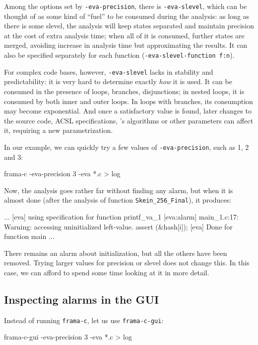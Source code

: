 \documentclass{frama-c-book}
\begin{document}
Among the options set by \verb|-eva-precision|, there is \verb|-eva-slevel|,
which can be thought of as some kind of ``fuel''
to be consumed during the analysis: as long as there is some slevel,
the analysis will keep states separated and maintain precision at the cost of
extra analysis time; when all of
it is consumed, further states are merged, avoiding increase in analysis time
but approximating the results. It can also be
specified separately for each function (\verb|-eva-slevel-function f:n|).

For complex code bases, however, \verb|-eva-slevel| lacks in stability and
predictability: it is very hard to determine exactly {\em how} it is used.
It can be consumed in the presence of loops, branches, disjunctions;
in nested loops, it is consumed by both inner and outer loops.
In loops with branches, its consumption may become exponential.
And once a satisfactory value is found, later changes to the source code,
ACSL specifications, \Eva{}'s algorithms or other parameters can affect it,
requiring a new parametrization.

In our example, we can quickly try a few values of \verb|-eva-precision|,
such as 1, 2 and 3:

\begin{frama-c-commands}
frama-c -eva-precision 3 -eva *.c > log
\end{frama-c-commands}

Now, the analysis goes rather far without finding any alarm,
but when it is almost done (after the analysis of function
\lstinline|Skein_256_Final|), it produces:
\begin{logs}
...
[eva] using specification for function printf_va_1
[eva:alarm] main_1.c:17: Warning:
  accessing uninitialized left-value. assert \initialized(&hash[i]);
[eva] Done for function main
...
\end{logs}

There remains an alarm about initialization, but all the others have been
removed. Trying larger values for precision or slevel does not change this.
In this case, we can afford to spend some time looking at it in more detail.

\subsection{Inspecting alarms in the GUI}

Instead of running \verb|frama-c|, let us use \verb|frama-c-gui|:

\begin{frama-c-commands}
frama-c-gui -eva-precision 3 -eva *.c > log
\end{frama-c-commands}
\end{document}
